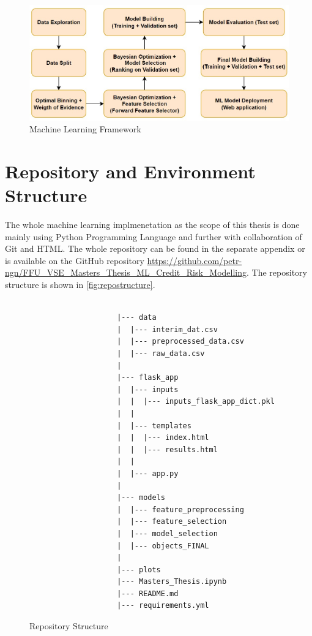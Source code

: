 \begin{figure}[H]
    \centering
    \caption{Machine Learning Framework}\vspace{0.5em}
    \label{fig:mlframe}
    \includegraphics[width=120mm]{Figures/ml_framework.jpg}

    \vspace{-1em}
\end{figure}

\section{Repository and Environment Structure}

The whole machine learning implmenetation as the scope of this thesis is done mainly using Python Programming Language and further with collaboration of Git and HTML.
The whole repository can be found in the separate appendix or is available on the GitHub repository \url{https://github.com/petr-ngn/FFU_VSE_Masters_Thesis_ML_Credit_Risk_Modelling}.
The repository structure is shown in \autoref{fig:repostructure}.
\begin{figure}[H]
    \centering\caption{Repository Structure}
    \label{fig:repostructure}

{\footnotesize
\begin{verbatim}

                    |--- data
                    |  |--- interim_dat.csv
                    |  |--- preprocessed_data.csv
                    |  |--- raw_data.csv
                    |
                    |--- flask_app
                    |  |--- inputs
                    |  |  |--- inputs_flask_app_dict.pkl
                    |  |
                    |  |--- templates
                    |  |  |--- index.html
                    |  |  |--- results.html
                    |  |
                    |  |--- app.py
                    |
                    |--- models
                    |  |--- feature_preprocessing
                    |  |--- feature_selection
                    |  |--- model_selection
                    |  |--- objects_FINAL
                    |
                    |--- plots
                    |--- Masters_Thesis.ipynb
                    |--- README.md
                    |--- requirements.yml
\end{verbatim}
}
\vspace{0em}
\end{figure}


